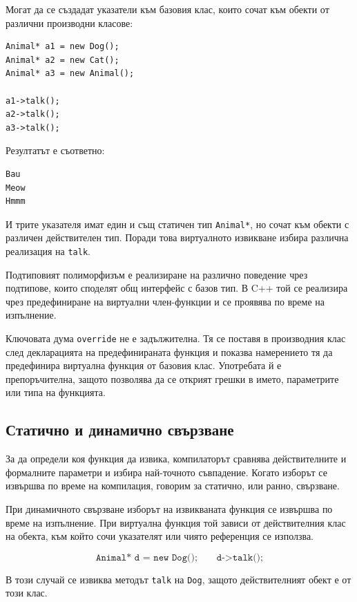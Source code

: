 Могат да се създадат указатели към базовия клас, които сочат към обекти от различни производни класове:

\begin{verbatim}
Animal* a1 = new Dog();
Animal* a2 = new Cat();
Animal* a3 = new Animal();

a1->talk();
a2->talk();
a3->talk();
\end{verbatim}

Резултатът е съответно:

\begin{verbatim}
Bau
Meow
Hmmm
\end{verbatim}

И трите указателя имат един и същ статичен тип \texttt{Animal*}, но сочат към обекти с различен действителен тип. Поради това виртуалното извикване избира различна реализация на \texttt{talk}.

\begin{defn}
Подтиповият полиморфизъм е реализиране на различно поведение чрез подтипове, които споделят общ интерфейс с базов тип. В C++ той се реализира чрез предефиниране на виртуални член-функции и се проявява по време на изпълнение.
\end{defn}

Ключовата дума \texttt{override} не е задължителна. Тя се поставя в производния клас след декларацията на предефинираната функция и показва намерението тя да предефинира виртуална функция от базовия клас. Употребата й е препоръчителна, защото позволява да се открият грешки в името, параметрите или типа на функцията.

\subsection{Статично и динамично свързване}\label{s:17.2.2}

За да определи коя функция да извика, компилаторът сравнява действителните и формалните параметри и избира най-точното съвпадение. Когато изборът се извършва по време на компилация, говорим за статично, или ранно, свързване.

При динамичното свързване изборът на извикваната функция се извършва по време на изпълнение. При виртуална функция той зависи от действителния клас на обекта, към който сочи указателят или чиято референция се използва.

\[
\texttt{Animal* d = new Dog();}\qquad
\texttt{d->talk();}
\]

В този случай се извиква методът \texttt{talk} на \texttt{Dog}, защото действителният обект е от този клас.

